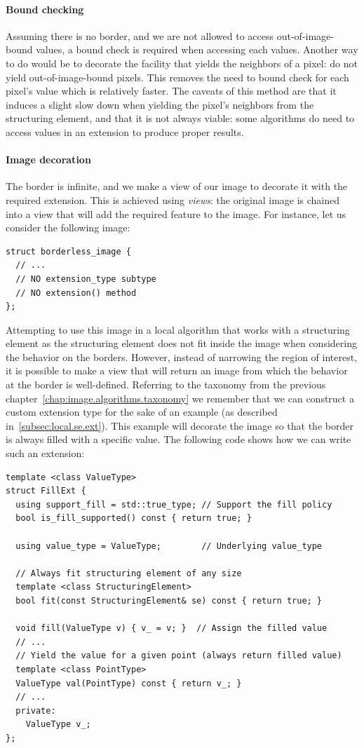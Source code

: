 \paragraph{Bound checking}
Assuming there is no border, and we are not allowed to access out-of-image-bound values, a bound check is required when
accessing each values. Another way to do would be to decorate the facility that yields the neighbors of a pixel: do not
yield out-of-image-bound pixels. This removes the need to bound check for each pixel's value which is relatively
faster. The caveats of this method are that it induces a slight slow down when yielding the pixel's neighbors from the
structuring element, and that it is not always viable: some algorithms do need to access values in an extension to
produce proper results.

\paragraph{Image decoration}
The border is infinite, and we make a view of our image to decorate it with the required extension. This is achieved
using \emph{views}: the original image is chained into a view that will add the required feature to the image. For instance, let us consider the following image:
\begin{verbatim}
struct borderless_image {
  // ...
  // NO extension_type subtype
  // NO extension() method
};
\end{verbatim}

Attempting to use this image in a local algorithm that works with a structuring element as the structuring element does
not fit inside the image when considering the behavior on the borders. However, instead of narrowing the region of
interest, it is possible to make a view that will return an image from which the behavior at the border is well-defined.
Referring to the taxonomy from the previous chapter~\ref{chap:image.algorithms.taxonomy} we remember that we can
construct a custom extension type for the sake of an example (as described in~\cref{subsec:local.se.ext}). This example
will decorate the image so that the border is always filled with a specific value. The following code shows how we can
write such an extension:
\begin{verbatim}
template <class ValueType>
struct FillExt {
  using support_fill = std::true_type; // Support the fill policy
  bool is_fill_supported() const { return true; }
  
  using value_type = ValueType;        // Underlying value_type
  
  // Always fit structuring element of any size
  template <class StructuringElement>
  bool fit(const StructuringElement& se) const { return true; }

  void fill(ValueType v) { v_ = v; }  // Assign the filled value
  // ...
  // Yield the value for a given point (always return filled value)
  template <class PointType>
  ValueType val(PointType) const { return v_; }
  // ...
  private:
    ValueType v_;
};
\end{verbatim}

